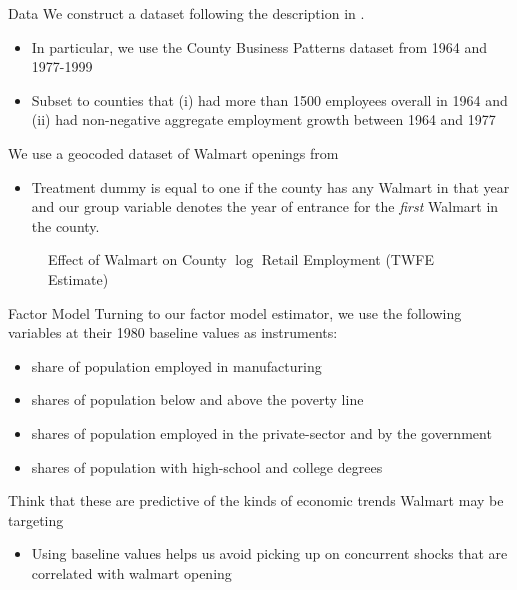 \documentclass[aspectratio=43,t]{beamer}
\begin{document}
\begin{frame}{Data}
  We construct a dataset following the description in \citet{basker2005job}.

  \begin{itemize}
    \item In particular, we use the County Business Patterns dataset from 1964 and 1977-1999
    \item Subset to counties that (i) had more than 1500 employees overall in 1964 and (ii) had non-negative aggregate employment growth between 1964 and 1977
  \end{itemize}

  \smallskip\pause
  We use a geocoded dataset of Walmart openings from \citet{arcidiacono2020competitive}

  \begin{itemize}
    \item Treatment dummy is equal to one if the county has any Walmart in that year and our group variable denotes the year of entrance for the \emph{first} Walmart in the county.
  \end{itemize}
\end{frame}

\begin{frame}
  \begin{figure}
    \caption{Effect of Walmart on County $\log$ Retail Employment (TWFE Estimate)}
    
    
  \end{figure}
\end{frame}

\begin{frame}{Factor Model}
  Turning to our factor model estimator, we use the following variables at their 1980 baseline values as instruments:
  \begin{itemize}
    \item share of population employed in manufacturing
    \item shares of population below and above the poverty line
    \item shares of population employed in the private-sector and by the government
    \item shares of population with high-school and college degrees
  \end{itemize}

  \smallskip\pause
  Think that these are predictive of the kinds of economic trends Walmart may be targeting
  \begin{itemize}
    \item Using baseline values helps us avoid picking up on concurrent shocks that are correlated with walmart opening
  \end{itemize}
\end{frame}
\end{document}
